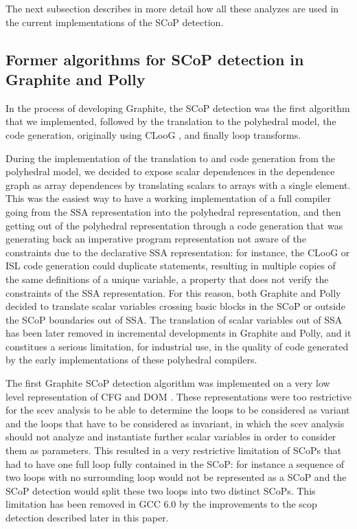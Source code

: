 \documentclass{sigplanconf}
\begin{document}
The next subsection describes in more detail how all these analyzes are used in
the current implementations of the SCoP detection.

\subsection{Former algorithms for SCoP detection in Graphite and Polly}

In the process of developing Graphite, the SCoP detection was the first
algorithm that we implemented, followed by the translation to the polyhedral
model, the code generation, originally using CLooG \cite{cloog}, and finally
loop transforms.

During the implementation of the translation to and code generation from the
polyhedral model, we decided to expose scalar dependences in the dependence
graph as array dependences by translating scalars to arrays with a single
element.  This was the easiest way to have a working implementation of a full
compiler going from the SSA representation into the polyhedral representation,
and then getting out of the polyhedral representation through a code generation
that was generating back an imperative program representation not aware of the
constraints due to the declarative SSA representation: for instance, the CLooG
or ISL code generation could duplicate statements, resulting in multiple copies
of the same definitions of a unique variable, a property that does not verify
the constraints of the SSA representation.  For this reason, both Graphite and
Polly decided to translate scalar variables crossing basic blocks in the SCoP or
outside the SCoP boundaries out of SSA.  The translation of scalar variables out
of SSA has been later removed in incremental developments in Graphite and Polly,
and it constitues a serious limitation, for industrial use, in the quality of
code generated by the early implementations of these polyhedral compilers.

The first Graphite SCoP detection algorithm was implemented on a very low level
representation of CFG and DOM \cite{trifunovic}.  These representations were
too restrictive for
the scev analysis to be able to determine the loops to be considered as variant
and the loops that have to be considered as invariant, in which the scev
analysis should not analyze and instantiate further scalar variables in order to
consider them as parameters.  This resulted in a very restrictive limitation of
SCoPs that had to have one full loop fully contained in the SCoP: for instance a
sequence of two loops with no surrounding loop would not be represented as a
SCoP and the SCoP detection would split these two loops into two distinct SCoPs.
This limitation has been removed in GCC 6.0 by the improvements to the scop
detection described later in this paper.
\end{document}
